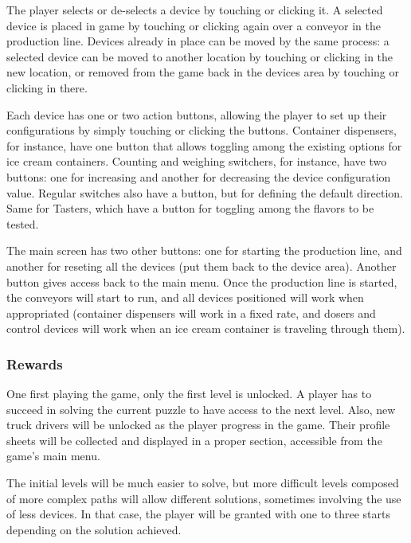 \documentclass[a4paper]{scrartcl}
\begin{document}
        The player selects or de-selects a device by touching or clicking it. A
        selected device is placed in game by touching or clicking again over a
        conveyor in the production line. Devices already in place can be moved
        by the same process: a selected device can be moved to another location
        by touching or clicking in the new location, or removed from the game
        back in the devices area by touching or clicking in there.

        Each device has one or two action buttons, allowing the player to set up
        their configurations by simply touching or clicking the buttons.
        Container dispensers, for instance, have one button that allows toggling
        among the existing options for ice cream containers. Counting and
        weighing switchers, for instance, have two buttons: one for increasing
        and another for decreasing the device configuration value. Regular
        switches also have a button, but for defining the default direction.
        Same for Tasters, which have a button for toggling among the flavors to
        be tested.

        The main screen has two other buttons: one for starting the production
        line, and another for reseting all the devices (put them back to the
        device area). Another button gives access back to the main menu. Once
        the production line is started, the conveyors will start to run, and all
        devices positioned will work when appropriated (container dispensers
        will work in a fixed rate, and dosers and control devices will work when
        an ice cream container is traveling through them).

    \subsubsection{Rewards}
        One first playing the game, only the first level is unlocked. A player
        has to succeed in solving the current puzzle to have access to the next
        level. Also, new truck drivers will be unlocked as the player progress
        in the game. Their profile sheets will be collected and displayed in a
        proper section, accessible from the game's main menu.

        The initial levels will be much easier to solve, but more difficult
        levels composed of more complex paths will allow different solutions,
        sometimes involving the use of less devices. In that case, the player
        will be granted with one to three starts depending on the solution
        achieved.
\end{document}
